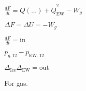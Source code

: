 \( \frac{dF}{dt} = \dot{Q}(\ldots) + \dot{Q}_{\text{EW}}^2 - \dot{W}_g \)  

\( \Delta F = \Delta U = -W_g \)  

\( \frac{dF}{dt} = \text{in} \)  

\( p_{g,12} - p_{\text{EW},12} \)  

\( \Delta_{\text{Ice}} \Delta_{\text{EW}} = \text{out} \)  

For gas.